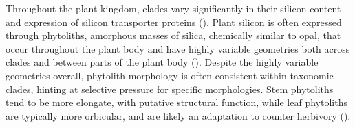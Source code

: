 \documentclass[12pt, letterpaper, ]{report}
\begin{document}
Throughout the plant kingdom, clades vary significantly in their silicon content and expression of silicon transporter proteins (\cite{ma_chapter_2001}). Plant silicon is often expressed through phytoliths, amorphous masses of silica, chemically similar to opal, that occur throughout the plant body and have highly variable geometries both across clades and between parts of the plant body (\cite{piperno_phytoliths_2006,parr_phytolith_2011}). Despite the highly variable geometries overall, phytolith morphology is often consistent within taxonomic clades, hinting at selective pressure for specific morphologies. Stem phytoliths tend to be more elongate, with putative structural function, while leaf phytoliths are typically more orbicular, and are likely an adaptation to counter herbivory (\cite{parr_phytolith_2011,stromberg_functions_2016}).


\end{document}
